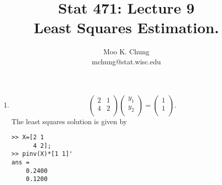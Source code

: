 \documentclass[11pt,twocolumn]{article} %
\begin{document}
\title{Stat 471: Lecture 9\\
Least Squares Estimation.}
\author{Moo K. Chung\\
mchung@stat.wisc.edu}
\maketitle \thispagestyle{empty}

\begin{enumerate}


\item $$\left(%
\begin{array}{cc}
  2 & 1 \\
  4 & 2 \\
\end{array}%
\right)\left(%
\begin{array}{c}
  y_1 \\
  y_2 \\
\end{array}%
\right) = \left(%
\begin{array}{c}
  1 \\
  1 \\
\end{array}%
\right).$$ The least squares solution is given by
\begin{verbatim}
>> X=[2 1
      4 2];
>> pinv(X)*[1 1]'
ans =
    0.2400
    0.1200
\end{verbatim}


\end{enumerate}
\end{document}
